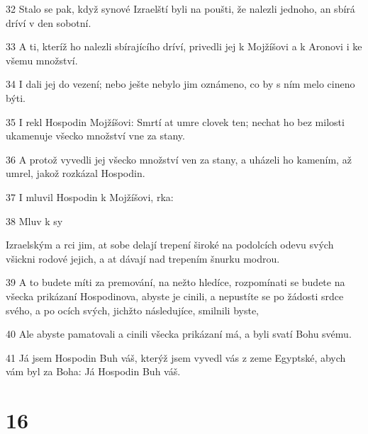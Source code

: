 \par 32 Stalo se pak, když synové Izraelští byli na poušti, že nalezli jednoho, an sbírá dríví v den sobotní.
\par 33 A ti, kteríž ho nalezli sbírajícího dríví, privedli jej k Mojžíšovi a k Aronovi i ke všemu množství.
\par 34 I dali jej do vezení; nebo ješte nebylo jim oznámeno, co by s ním melo cineno býti.
\par 35 I rekl Hospodin Mojžíšovi: Smrtí at umre clovek ten; nechat ho bez milosti ukamenuje všecko množství vne za stany.
\par 36 A protož vyvedli jej všecko množství ven za stany, a uházeli ho kamením, až umrel, jakož rozkázal Hospodin.
\par 37 I mluvil Hospodin k Mojžíšovi, rka:
\par 38 Mluv k sy\par Izraelským a rci jim, at sobe delají trepení široké na podolcích odevu svých všickni rodové jejich, a at dávají nad trepením šnurku modrou.
\par 39 A to budete míti za premování, na nežto hledíce, rozpomínati se budete na všecka prikázaní Hospodinova, abyste je cinili, a nepustíte se po žádosti srdce svého, a po ocích svých, jichžto následujíce, smilnili byste,
\par 40 Ale abyste pamatovali a cinili všecka prikázaní má, a byli svatí Bohu svému.
\par 41 Já jsem Hospodin Buh váš, kterýž jsem vyvedl vás z zeme Egyptské, abych vám byl za Boha: Já Hospodin Buh váš.

\chapter{16}

